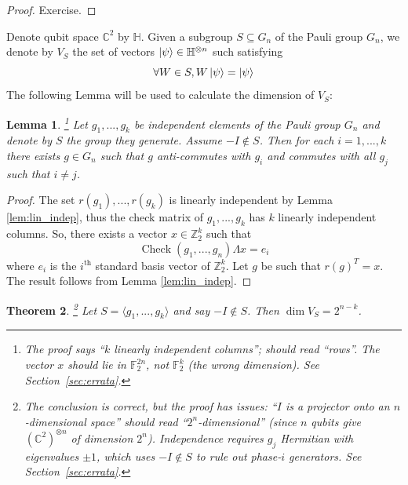 \documentclass[12pt]{article}
\theoremstyle{plain}
\newtheorem{thm}{Theorem}[subsection] %
\newtheorem{lemma}[thm]{Lemma}
\theoremstyle{definition}
\newcommand{\bb}[1]{\mathbb{#1}}
\begin{document}
\begin{proof}
Exercise.
\end{proof}
Denote qubit space $\bb{C}^2$ by $\bb{H}$. Given a subgroup $S \subseteq G_n$ of the Pauli group $G_n$, we denote by $V_S$ the set of vectors $\ket{\psi} \in \bb{H}^{\otimes n}$ such satisfying
\begin{equation}
\forall W \in S, W\ket{\psi} = \ket{\psi}
\end{equation}
The following Lemma will be used to calculate the dimension of $V_S$:
\begin{lemma}\label{lem:anti_commutes}\footnote{The proof says ``$k$ linearly independent columns''; should read ``rows''. The vector $x$ should lie in $\mathbb{F}_2^{2n}$, not $\mathbb{F}_2^k$ (the wrong dimension). See Section~\ref{sec:errata}.}
Let $g_1,...,g_k$ be independent elements of the Pauli group $G_n$ and denote by $S$ the group they generate. Assume $-I \not\in S$. Then for each $i = 1,...,k$ there exists $g \in G_n$ such that $g$ anti-commutes with $g_i$ and commutes with all $g_j$ such that $i \neq j$.
\end{lemma}
\begin{proof}
The set $r(g_1),...,r(g_k)$ is linearly independent by Lemma \ref{lem:lin_indep}, thus the check matrix of $g_1,...,g_k$ has $k$ linearly independent columns. So, there exists a vector $x \in \bb{Z}_2^k$ such that
\begin{equation}
\operatorname{Check}(g_1,...,g_n)\Lambda x = e_i
\end{equation}
where $e_i$ is the $i^{\text{th}}$ standard basis vector of $\bb{Z}_2^k$. Let $g$ be such that $r(g)^T = x$. The result follows from Lemma \ref{lem:lin_indep}.
\end{proof}
\begin{thm}\footnote{The conclusion is correct, but the proof has issues: ``$I$ is a projector onto an $n$-dimensional space'' should read ``$2^n$-dimensional'' (since $n$ qubits give $(\mathbb{C}^2)^{\otimes n}$ of dimension $2^n$). Independence requires $g_j$ Hermitian with eigenvalues $\pm 1$, which uses $-I\notin S$ to rule out phase-$i$ generators. See Section~\ref{sec:errata}.}
Let $S = \langle g_1,...,g_k\rangle$ and say $-I \not\in S$. Then $\operatorname{dim}V_S = 2^{n - k}$.
\end{thm}
\end{document}
